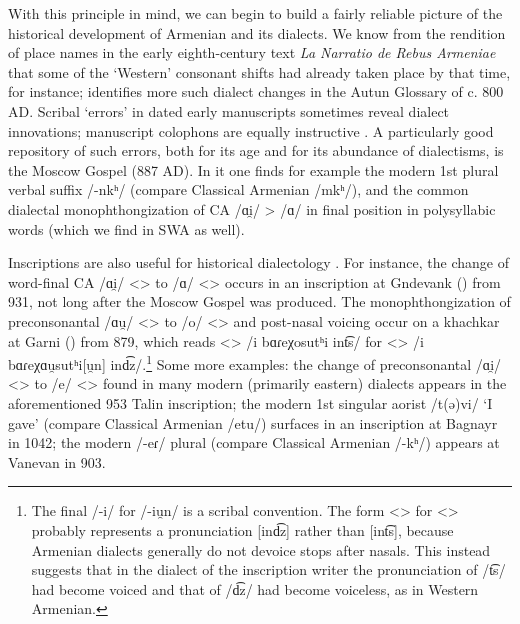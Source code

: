\documentclass[output=paper]{langscibook}
\begin{document}
With this principle in mind, we can begin to build a fairly reliable picture of the historical development of Armenian and its dialects. We know from the rendition of place names in the early eighth-century text \textit{La Narratio de Rebus Armeniae} \citep{Garitte-1952-NarratioRebusArmeniae} that some of the `Western'  consonant shifts had already taken place by that time, for instance; \citet{Weitenberg-1983-ArmeniandialectsLatinArmenianglossaryAutun} identifies more such dialect changes in the Autun Glossary of c. 800 AD. Scribal `errors'  in dated early manuscripts sometimes reveal dialect innovations; manuscript colophons are equally instructive \citep{Jahukyan-1997-Colophon}. A particularly good repository of such errors, both for its age and for its abundance of dialectisms, is the Moscow Gospel (887 AD). In it one finds for example the modern 1st plural verbal suffix /-nkʰ/ (compare Classical Armenian  /mkʰ/), and the common dialectal monophthongization of CA /ɑi̯/ > /ɑ/ in final position in polysyllabic words (which we find in SWA as well). 

Inscriptions are also useful for historical dialectology \citep{Arakelyan-1960-Lithography}. For instance, the change of word-final CA /ɑi̯/ <> to  /ɑ/ <>  occurs in an inscription at Gndevank () from 931, not long  after the Moscow Gospel was produced. The monophthongization of preconsonantal  /ɑu̯/ <> to /o/ <>  and post-nasal voicing occur on a khachkar at Garni () from 879, which reads <> /i bɑɾeχosutʰi int͡s/ for <> /i bɑɾeχɑu̯sutʰi[u̯n] ind͡z/.\footnote{The final /-i/ for /-iu̯n/ is a scribal convention. The form <> for <> probably represents a pronunciation [ind͡z] rather than [int͡s], because Armenian dialects generally do not devoice stops after nasals. This instead suggests that in the dialect of the inscription writer the pronunciation of /t͡s/ had become voiced and that of /d͡z/ had become voiceless, as in Western Armenian.} Some more examples: the change of preconsonantal  /ɑi̯/ <> to /e/ <> found in many modern (primarily eastern) dialects appears in the aforementioned 953 Talin inscription; the modern 1st singular aorist /t(ə)vi/ `I gave' (compare Classical  Armenian /etu/) surfaces in an inscription at Bagnayr in 1042; the modern /-eɾ/ plural (compare Classical Armenian /-kʰ/) appears at Vanevan in 903.

 
\end{document}
